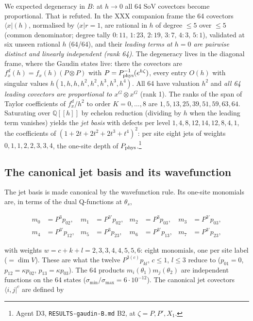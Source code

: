 \documentclass[11pt]{article}
\begin{document}
We expected degeneracy in $B$: at $h\to0$ all $64$ SoV covectors become proportional.
That is refuted.
In the XXX companion frame the 64 covectors $\langle x|(h)$, normalised by $\langle x|r=1$, are rational in $h$ of degree $\le5$ over $\le5$ (common denominator; degree tally $0:11,\,1:23,\,2:19,\,3:7,\,4:3,\,5:1$), validated at six unseen rational $h$ (64/64), and their \emph{leading terms at $h=0$ are pairwise distinct and linearly independent (rank 64)}.
The degeneracy lives in the diagonal frame, where the Gaudin states live: there the covectors are $f^d_x(h)=f_x(h)(P\otimes P)$ with $P=P_{\rm phys}^{-1}(e^{h\zeta})$, every entry $O(h)$ with singular values $h(1,h,h,h^2,h^2,h^3,h^3,h^4)$. All 64 have valuation $h^2$ and \emph{all 64 leading covectors are proportional to $x^G\otimes x^G$} (rank 1).
The ranks of the span of Taylor coefficients of $f^d_x/h^2$ to order $K=0,\dots,8$ are $1,5,13,25,39,51,59,63,64$. Saturating over $\mathbb{Q}[[h]]$ by echelon reduction (dividing by $h$ when the leading term vanishes) yields the \emph{jet basis} with defects per level $1,4,8,12,14,12,8,4,1$, the coefficients of $(1+2t+2t^2+2t^3+t^4)^2$: per site eight jets of weights $0,1,1,2,2,3,3,4$, the one-site depth of $P_{\rm phys}$.\footnote{Agent D3, \texttt{RESULTS-\allowbreak{}gaudin-\allowbreak{}B.\allowbreak{}md} B2, at $\zeta=P,P',X_1$.}

\subsection{The canonical jet basis and its wavefunction}\label{sec:canjet}

The jet basis is made canonical by the wavefunction rule.
Its one-site monomials are, in terms of the dual Q-functions at $\theta_s$,

\begin{equation}
\begin{aligned}
m_0&=P^3p_{02},& m_1&=P^{3\prime}p_{02},& m_2&=P^3p_{03},& m_3&=P^{3\prime}p_{03},\\
m_4&=P^{3\prime}p_{12},& m_5&=P^3p_{23},& m_6&=P^{3\prime}p_{13},& m_7&=P^{3\prime}p_{23},
\end{aligned}\label{eq:m8}
\end{equation}

with weights $w=c+k+l=2,3,3,4,4,5,5,6$: eight monomials, one per site label ($=\dim V$).
These are what the twelve $P^{3(c)}p_{kl}$, $c\le1$, $l\le3$ reduce to ($p_{01}=0$, $p_{12}=\kappa p_{02}$, $p_{13}=\kappa p_{03}$).
The 64 products $m_i(\theta_1)m_j(\theta_2)$ are independent functions on the 64 states ($\sigma_{\min}/\sigma_{\max}=6\cdot10^{-12}$).
The canonical jet covectors $\langle i,j|^c$ are defined by
\end{document}

